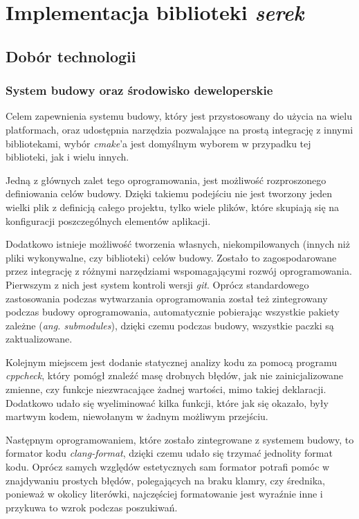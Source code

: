 \documentclass[12pt]{article}
\newcommand{\n}{\newline}
\newcommand{\nonpl}[1]{{\it #1}}
\newcommand{\ang}[1]{\nonpl{ang. #1}}
\newcommand{\serek}{\nonpl{serek}}
\begin{document}
	{
		\section{Implementacja biblioteki \serek}\label{serek}

		{
			\subsection{Dobór technologii}

			{
				\subsubsection{System budowy oraz środowisko deweloperskie}

				Celem zapewnienia systemu budowy, który jest przystosowany do użycia na wielu platformach, oraz udostępnia narzędzia pozwalające na prostą
				integrację z innymi bibliotekami, wybór \nonpl{cmake}'a\cite{cmake_docs} jest domyślnym wyborem w przypadku tej biblioteki, jak i wielu innych.\n

				Jedną z głównych zalet tego oprogramowania, jest możliwość rozproszonego definiowania celów budowy. Dzięki takiemu podejściu nie jest tworzony
				jeden wielki plik z definicją całego projektu, tylko wiele plików, które skupiają się na konfiguracji poszczególnych elementów aplikacji.\n

				Dodatkowo istnieje możliwość tworzenia własnych, niekompilowanych (innych niż pliki wykonywalne, czy biblioteki) celów budowy. Zostało to zagospodarowane
				przez integrację z różnymi narzędziami wspomagającymi rozwój oprogramowania. Pierwszym z nich jest system kontroli wersji \nonpl{git}\cite{git_docs}. Oprócz standardowego
				zastosowania podczas wytwarzania oprogramowania został też zintegrowany podczas budowy oprogramowania, automatycznie pobierając wszystkie pakiety zależne
				(\ang{submodules}), dzięki czemu podczas budowy, wszystkie paczki są zaktualizowane.\n

				Kolejnym miejscem jest dodanie statycznej analizy kodu za pomocą programu \nonpl{cppcheck}\cite{cppcheck_repo}, który pomógł znaleźć masę drobnych błędów,
				jak nie zainicjalizowane zmienne, czy funkcje niezwracające żadnej wartości, mimo takiej deklaracji. Dodatkowo udało się wyeliminować kilka funkcji,
				które jak się okazało, były martwym kodem, niewołanym w żadnym możliwym przejściu.\n

				Następnym oprogramowaniem, które zostało zintegrowane z systemem budowy, to formator kodu \nonpl{clang-format}\cite{clangformat_docs}, dzięki czemu
				udało się trzymać jednolity format kodu. Oprócz samych względów estetycznych sam formator potrafi pomóc w znajdywaniu prostych błędów, polegających
				na braku klamry, czy średnika, ponieważ w okolicy literówki, najczęściej formatowanie jest wyraźnie inne i przykuwa to wzrok podczas poszukiwań.\n

}}}
\end{document}
